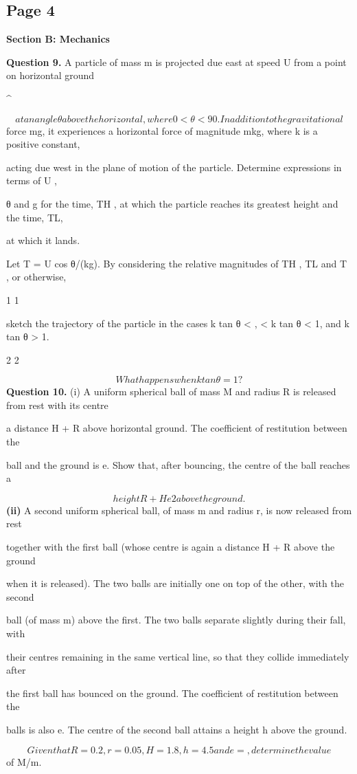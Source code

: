 \documentclass[12pt]{article}
\begin{document}
\subsection*{Page 4}
\begin{flushleft}
\bigskip\textbf{Section B: Mechanics}\par
\bigskip\textbf{Question 9.} A particle of mass m is projected due east at speed U from a point on horizontal ground\par
\textasciicircum{}\circ\par
\[at an angle θ above the horizontal, where 0 < θ < 90 . In addition to the gravitational\]
force mg, it experiences a horizontal force of magnitude mkg, where k is a positive constant,\par
acting due west in the plane of motion of the particle. Determine expressions in terms of U ,\par
θ and g for the time, TH , at which the particle reaches its greatest height and the time, TL,\par
at which it lands.\par
Let T = U cos θ/(kg). By considering the relative magnitudes of TH , TL and T , or otherwise,\par
1 1\par
sketch the trajectory of the particle in the cases k tan θ < , < k tan θ < 1, and k tan θ > 1.\par
2 2\par
\[What happens when k tan θ = 1?\]
\bigskip\textbf{Question 10.} (i) A uniform spherical ball of mass M and radius R is released from rest with its centre\par
a distance H + R above horizontal ground. The coefficient of restitution between the\par
ball and the ground is e. Show that, after bouncing, the centre of the ball reaches a\par
\[height R + He2 above the ground.\]
\textbf{(ii)} A second uniform spherical ball, of mass m and radius r, is now released from rest\par
together with the first ball (whose centre is again a distance H + R above the ground\par
when it is released). The two balls are initially one on top of the other, with the second\par
ball (of mass m) above the first. The two balls separate slightly during their fall, with\par
their centres remaining in the same vertical line, so that they collide immediately after\par
the first ball has bounced on the ground. The coefficient of restitution between the\par
balls is also e. The centre of the second ball attains a height h above the ground.\par
\[Given that R = 0.2, r = 0.05, H = 1.8, h = 4.5 and e = , determine the value\]
of M/m.\par
\end{flushleft}
\end{document}
